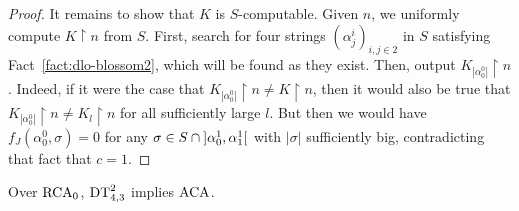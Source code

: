\begin{proof}
  It remains to show that $K$ is $S$-computable. Given $n$, we uniformly compute $K \upharpoonright n$ from $S$. First, search for four strings $(\alpha^i_j)_{i,j\in2}$ in $S$ satisfying Fact~\ref{fact:dlo-blossom2}, which will be found as they exist. Then, output $K_{|\alpha^0_{0}|}\upharpoonright n$. Indeed, if it were the case that $K_{|\alpha^0_{0}|}\upharpoonright n\neq K\upharpoonright n$, then it would also be true that $K_{|\alpha^0_{0}|}\upharpoonright n\neq K_l \upharpoonright n$ for all sufficiently large $l$. But then we would have $f_J(\alpha^0_{0}, \sigma)= 0$ for any $\sigma\in S\cap\interval[open]{\alpha^1_{0}}{\alpha^1_{1}}$ with $|\sigma|$ sufficiently big, contradicting that fact that $c = 1$.
\end{proof}

\begin{corollary}\label{cor:dt2to3-implies-aca}
	Over $\mathrm{RCA}_0$, $\mathrm{DT}^{2}_{4,3}$ implies $\mathrm{ACA}$.
\end{corollary}

